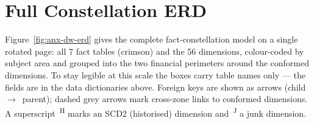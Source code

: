 \section{Full Constellation ERD}
\label{anx:dw-erd}

Figure~\ref{fig:anx-dw-erd} gives the complete fact-constellation model on a single rotated page: all 7
fact tables (crimson) and the 56 dimensions, colour-coded by subject area and grouped into the two
financial perimeters around the conformed dimensions. To stay legible at this scale the boxes carry
table names only --- the fields are in the data dictionaries above. Foreign keys are shown as arrows
(child~$\rightarrow$~parent); dashed grey arrows mark cross-zone links to conformed dimensions. A
superscript~\textsuperscript{H} marks an SCD2 (historised) dimension and~\textsuperscript{J} a junk
dimension.

